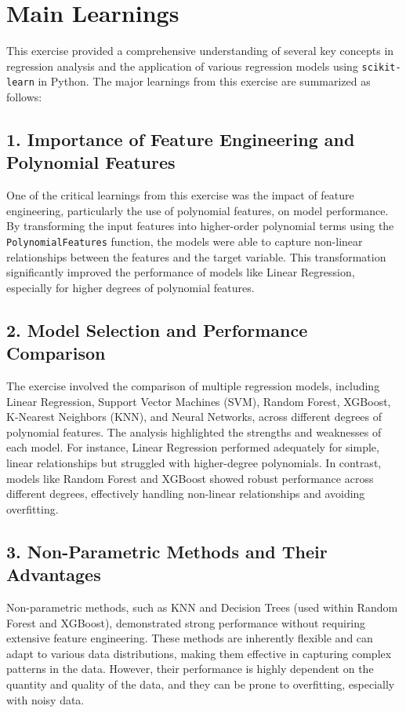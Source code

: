 \section*{Main Learnings}

This exercise provided a comprehensive understanding of several key concepts in regression analysis and the application of various regression models using \texttt{scikit-learn} in Python. The major learnings from this exercise are summarized as follows:

\subsection*{1. Importance of Feature Engineering and Polynomial Features}
One of the critical learnings from this exercise was the impact of feature engineering, particularly the use of polynomial features, on model performance. By transforming the input features into higher-order polynomial terms using the \texttt{PolynomialFeatures} function, the models were able to capture non-linear relationships between the features and the target variable. This transformation significantly improved the performance of models like Linear Regression, especially for higher degrees of polynomial features.

\subsection*{2. Model Selection and Performance Comparison}
The exercise involved the comparison of multiple regression models, including Linear Regression, Support Vector Machines (SVM), Random Forest, XGBoost, K-Nearest Neighbors (KNN), and Neural Networks, across different degrees of polynomial features. The analysis highlighted the strengths and weaknesses of each model. For instance, Linear Regression performed adequately for simple, linear relationships but struggled with higher-degree polynomials. In contrast, models like Random Forest and XGBoost showed robust performance across different degrees, effectively handling non-linear relationships and avoiding overfitting.

\subsection*{3. Non-Parametric Methods and Their Advantages}
Non-parametric methods, such as KNN and Decision Trees (used within Random Forest and XGBoost), demonstrated strong performance without requiring extensive feature engineering. These methods are inherently flexible and can adapt to various data distributions, making them effective in capturing complex patterns in the data. However, their performance is highly dependent on the quantity and quality of the data, and they can be prone to overfitting, especially with noisy data.

